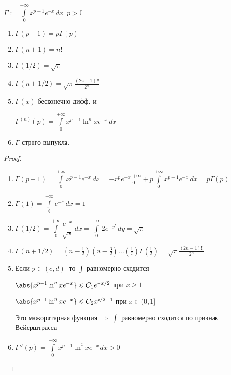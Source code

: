 \begin{definition}\thmslashn
	
	$\Gamma := \int\limits_{0}^{+\infty} x^{p-1}e^{-x}\,dx \;\; p > 0$
	
\end{definition}

\begin{properties}\thmslashn
	
	\begin{enumerate}
		\item 
		$\Gamma(p+1) = p \Gamma(p)$
		\item 
		$\Gamma(n+1) = n!$
		\item 
		$\Gamma(1/2) = \sqrt{\pi}$
		\item 
		$\Gamma(n + 1/2) = \sqrt{\pi}\frac{(2n-1)!!}{2^n}$
		\item 
		$\Gamma(x)$ бесконечно дифф.  и 
		
		$\Gamma^{(n)}(p) = \int\limits_{0}^{+\infty} x^{p-1} \ln^n x e^{-x} \,dx$
		\item 
		$\Gamma$ строго выпукла.
	\end{enumerate}
	
\end{properties}

\begin{proof}\thmslashn
	
	\begin{enumerate}
		\item 
		$\Gamma(p+1) = \int\limits_{0}^{+\infty} x^{p-1}e^{-x}\,dx = -x^pe^{-x}\Big|_{0}^{+\infty} +  p \int\limits_{0}^{+\infty} x^{p-1}e^{-x}\,dx = p\Gamma(p)$
		\item 
		$\Gamma(1) = \int\limits_{0}^{+\infty} e^{-x}\,dx = 1$
		\item 
		$\Gamma(1/2) = \int\limits_{0}^{+\infty} \dfrac{e^{-x}}{\sqrt{x}}\,dx = \int\limits_{0}^{+\infty} 2e^{-y^2}\,dy = \sqrt{\pi}$
		\item 
		$\Gamma(n + 1/2) = \left(n-\frac{1}{2} \right)\left(n-\frac{3}{2} \right)\ldots \left(\frac{1}{2} \right) \Gamma\left(\frac{1}{2}\right) = \sqrt{\pi}\frac{(2n-1)!!}{2^n}$
		\item 
		Если $p \in (c, d)$, то $\int$ равномерно сходится 
		
		$\abs{x^{p-1} \ln^n x e^{-x}} \leqslant C_1e^{-x/2}$ при $x \geqslant 1$
		
		$\abs{x^{p-1} \ln^n x e^{-x}} \leqslant C_2x^{c/2-1}$ при $x \in (0, 1]$
		
		Это мажоритарная функция $\Rightarrow$ $\int$ равномерно сходится по признак Вейерштрасса
		\item 
		$\Gamma''(p) =  \int\limits_{0}^{+\infty} x^{p-1} \ln^2 x e^{-x} \,dx > 0$
	\end{enumerate}
	
\end{proof}